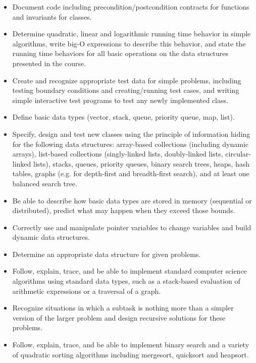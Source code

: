 {\begin{highlight}[\CSPBDataStruct]
        \begin{itemize}
            \item Document code including precondition/postcondition contracts for functions and invariants for classes.
            \item Determine quadratic, linear and logarithmic running time behavior in simple algorithms, write big-O expressions to describe this behavior, and state the running time behaviors for all basic operations on the data structures presented in the course.
            \item Create and recognize appropriate test data for simple problems, including testing boundary conditions and creating/running test cases, and writing simple interactive test programs to test any newly implemented class.
            \item Define basic data types (vector, stack, queue, priority queue, map, list).
            \item Specify, design and test new classes using the principle of information hiding for the following data structures: array-based collections (including dynamic arrays), list-based collections (singly-linked lists, doubly-linked lists, circular-linked lists), stacks, queues, priority queues, binary search trees, heaps, hash tables, graphs (e.g. for depth-first and breadth-first search), and at least one balanced search tree.
            \item Be able to describe how basic data types are stored in memory (sequential or distributed), predict what may happen when they exceed those bounds.
            \item Correctly use and manipulate pointer variables to change variables and build dynamic data structures.
            \item Determine an appropriate data structure for given problems.
            \item Follow, explain, trace, and be able to implement standard computer science algorithms using standard data types, such as a stack-based evaluation of arithmetic expressions or a traversal of a graph.
            \item Recognize situations in which a subtask is nothing more than a simpler version of the larger problem and design recursive solutions for these problems.
            \item Follow, explain, trace, and be able to implement binary search and a variety of quadratic sorting algorithms including mergesort, quicksort and heapsort.
        \end{itemize}
        

\end{highlight}}

